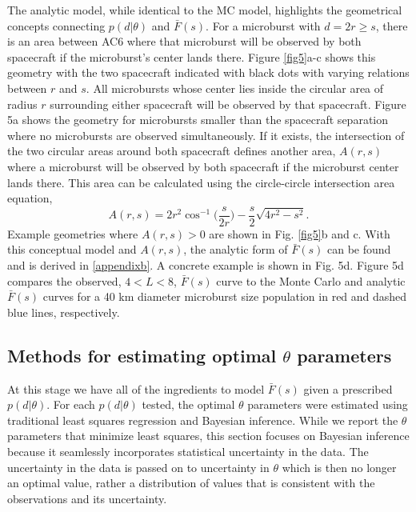 \documentclass[draft]{agujournal2019}
\begin{document}
The analytic model, while identical to the MC model, highlights the geometrical concepts connecting $p(d | \theta)$ and $\bar{F}(s)$. For a microburst with $d = 2r \geq s$, there is an area between AC6 where that microburst will be observed by both spacecraft if the microburst's center lands there. Figure \ref{fig5}a-c shows this geometry with the two spacecraft indicated with black dots with varying relations between $r$ and $s$. All microbursts whose center lies inside the circular area of radius $r$ surrounding either spacecraft will be observed by that spacecraft. Figure 5a shows the geometry for microbursts smaller than the spacecraft separation where no microbursts are observed simultaneously. If it exists, the intersection of the two circular areas around both spacecraft defines another area, $A(r, s)$ where a microburst will be observed by both spacecraft if the microburst center lands there. This area can be calculated using the circle-circle intersection area equation, 
\begin{equation} \label{circle_circle_intersect}
A(r, s) = 2r^2 \cos^{-1}{\Big( \frac{s}{2r} \Big)} - \frac{s}{2} \sqrt{4r^2 - s^2}.
\end{equation} Example geometries where $A(r, s) > 0$ are shown in Fig. \ref{fig5}b and c. With this conceptual model and $A(r, s)$, the analytic form of $\bar{F}(s)$ can be found and is derived in \ref{appendixb}. A concrete example is shown in Fig. 5d. Figure 5d compares the observed, $4<L<8$, $\bar{F}(s)$ curve to the Monte Carlo and analytic $\bar{F}(s)$ curves for a 40 km diameter microburst size population in red and dashed blue lines, respectively.

\subsection{Methods for estimating optimal $\theta$ parameters}
At this stage we have all of the ingredients to model $\bar{F}(s)$ given a prescribed $p(d | \theta)$. For each $p(d | \theta)$ tested, the optimal $\theta$ parameters were estimated using traditional least squares regression and Bayesian inference. While we report the $\theta$ parameters that minimize least squares, this section focuses on Bayesian inference because it seamlessly incorporates statistical uncertainty in the data. The uncertainty in the data is passed on to uncertainty in $\theta$ which is then no longer an optimal value, rather a distribution of values that is consistent with the observations and its uncertainty. 
\end{document}
